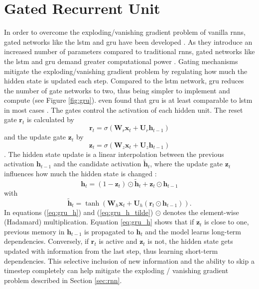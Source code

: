 \documentclass[12pt, a4paper, headinclude, twoside, plainheadsepline, open=right, numbers=noenddot, hidelinks, toc=listof, toc=bibliography]{scrreprt}
\begin{document}
\section{Gated Recurrent Unit}
\label{sec:gru}
In order to overcome the exploding/vanishing gradient problem of vanilla \acp{rnn}, gated networks like the \ac{lstm} \cite{hochreiterLongShortTermMemory1997} and \ac{gru} \cite{choLearningPhraseRepresentations2014} have been developed \cite{vanhoudtReviewLongShortterm2020}.
As they introduce an increased number of parameters compared to traditional \acp{rnn}, gated networks like the \ac{lstm} and \ac{gru} demand greater computational power \cite{deyGatevariantsGatedRecurrent2017}.
Gating mechanisms mitigate the exploding/vanishing gradient problem by regulating how much the hidden state is updated each step.
Compared to the \ac{lstm} network, \ac{gru} reduces the number of gate networks to two, thus being simpler to implement and compute \cite{choLearningPhraseRepresentations2014} (see Figure \ref{fig:gru}).
 even found that \ac{gru} is at least comparable to \ac{lstm} in most cases \cite{chungEmpiricalEvaluationGated2014}.
The gates control the activation of each hidden unit.
The reset gate $\mathbf{r}_t$ is calculated by
\begin{equation}
\label{eq:gru_reset}
\mathbf{r}_t = \sigma (\mathbf{W}_r \mathbf{x}_t + \mathbf{U}_r \mathbf{h}_{t-1})
\end{equation}
and the update gate $\mathbf{z}_t$ by
\begin{equation}
\label{eq:gru_update}
\mathbf{z}_t = \sigma (\mathbf{W}_z \mathbf{x}_t + \mathbf{U}_z \mathbf{h}_{t-1})
\end{equation}
\cite{deyGatevariantsGatedRecurrent2017}.
The hidden state update is a linear interpolation between the previous activation $\mathbf{h}_{t-1}$ and the candidate activation $\mathbf{\tilde{h}}_t$, where the update gate $\mathbf{z}_t$ influences how much the hidden state is changed \cite{chungEmpiricalEvaluationGated2014}:
\begin{equation}
\label{eq:gru_h}
\mathbf{h}_t = (1-\mathbf{z}_t) \odot \mathbf{\tilde{h}}_t + \mathbf{z}_t \odot \mathbf{h}_{t-1} 
\end{equation}
with
\begin{equation}
\label{eq:gru_h_tilde}
\mathbf{\tilde{h}}_t = \tanh(\mathbf{W}_h \mathbf{x}_t + \mathbf{U}_h (\mathbf{r}_t \odot \mathbf{h}_{t-1})).
\end{equation}
In equations (\ref{eq:gru_h}) and (\ref{eq:gru_h_tilde}) $\odot$ denotes the element-wise (Hadamard) multiplication.
Equation \ref{eq:gru_h} shows that if $\mathbf{z}_t$ is close to one, previous memory in $\mathbf{h}_{t-1}$ is propagated to $\mathbf{h}_t$ and the model learns long-term dependencies.
Conversely, if $\mathbf{r}_t$ is active and $\mathbf{z}_t$ is not, the hidden state gets updated with information from the last step, thus learning short-term dependencies.
This selective inclusion of new information and the ability to skip a timestep completely can help mitigate the exploding / vanishing gradient problem described in Section \ref{sec:rnn}.
\end{document}
